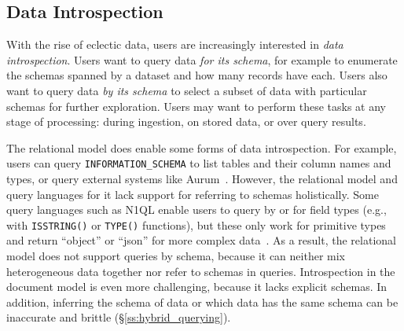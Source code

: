 
\vspace{-1em}

\subsection{Data Introspection} \label{ss:hybrid_schema}

With the rise of eclectic data, users are increasingly interested in {\em data introspection}. Users want to query data {\em for its schema}, for example to enumerate the schemas spanned by a dataset and how many records have each. Users also want to query data {\em by its schema} to select a subset of data with particular schemas for further exploration. 
Users may want to perform these tasks at any stage of processing: during ingestion, on stored data, or over query results.

The relational model does enable some forms of data introspection. For example, users can query \texttt{INFORMATION\_SCHEMA} to list tables and their column names and types, or query external systems like Aurum~\cite{aurum}.
However, the relational model and query languages for it lack support for referring to schemas holistically. Some query languages such as N1QL enable users to query by or for field types (e.g., with \texttt{ISSTRING()} or \texttt{TYPE()} functions), but these only work for primitive types and return ``object'' or ``json'' for more complex data~\cite{sqlite, n1ql, mongo}. As a result, the relational model does not support queries by schema, because it can neither mix heterogeneous data together nor refer to schemas in queries. Introspection in the document model is even more challenging, because it lacks explicit schemas. In addition, inferring the schema of data or which data has the same schema can be inaccurate and brittle (\S\ref{ss:hybrid_querying}).

